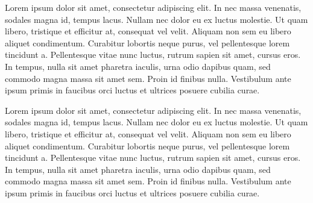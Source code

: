 
Lorem ipsum dolor sit amet, consectetur adipiscing elit. In nec massa venenatis, sodales magna id, tempus lacus. Nullam nec dolor eu ex luctus molestie. Ut quam libero, tristique et efficitur at, consequat vel velit. Aliquam non sem eu libero aliquet condimentum. Curabitur lobortis neque purus, vel pellentesque lorem tincidunt a. Pellentesque vitae nunc luctus, rutrum sapien sit amet, cursus eros. In tempus, nulla sit amet pharetra iaculis, urna odio dapibus quam, sed commodo magna massa sit amet sem. Proin id finibus nulla. Vestibulum ante ipsum primis in faucibus orci luctus et ultrices posuere cubilia curae.


Lorem ipsum dolor sit amet, consectetur adipiscing elit. In nec massa venenatis, sodales magna id, tempus lacus. Nullam nec dolor eu ex luctus molestie. Ut quam libero, tristique et efficitur at, consequat vel velit. Aliquam non sem eu libero aliquet condimentum. Curabitur lobortis neque purus, vel pellentesque lorem tincidunt a. Pellentesque vitae nunc luctus, rutrum sapien sit amet, cursus eros. In tempus, nulla sit amet pharetra iaculis, urna odio dapibus quam, sed commodo magna massa sit amet sem. Proin id finibus nulla. Vestibulum ante ipsum primis in faucibus orci luctus et ultrices posuere cubilia curae.